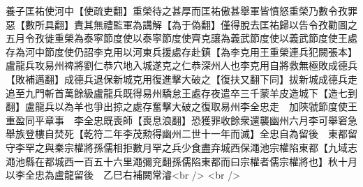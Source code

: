 養子匡祐使河中【使疏吏翻】重榮待之甚厚而匡祐傲甚舉軍皆憤怒重榮乃數令孜罪惡【數所具翻】責其無禮監軍為講解【為于偽翻】僅得脫去匡祐歸以告令孜勸圖之五月令孜徙重榮為泰寜節度使以泰寜節度使齊克讓為義武節度使以義武節度使王處存為河中節度使仍詔李克用以河東兵援處存赴鎮【為李克用王重榮連兵犯闕張本】　盧龍兵攻易州禆將劉仁恭穴地入城遂克之仁恭深州人也李克用自將救無極敗成德兵【敗補邁翻】成德兵退保新城克用復進擊大破之【復扶又翻下同】拔新城成德兵走追至九門斬首萬餘級盧龍兵既得易州驕怠王處存夜遣卒三千蒙羊皮造城下【造七到翻】盧龍兵以為羊也爭出掠之處存奮擊大破之復取易州李全忠走　加陝虢節度使王重盈同平章事　李全忠既喪師【喪息浪翻】恐獲罪收餘衆還襲幽州六月李可舉窘急舉族登樓自焚死【乾符二年李茂勲得幽州二世十一年而滅】全忠自為留後　東都留守李罕之與秦宗權將孫儒相拒數月罕之兵少食盡弃城西保澠池宗權陷東都【九域志澠池縣在都城西一百五十六里澠彌兖翻孫儒陷東都而曰宗權者儒宗權將也】秋十月以李全忠為盧龍留後　乙巳右補闕常濬<br />
<br />
